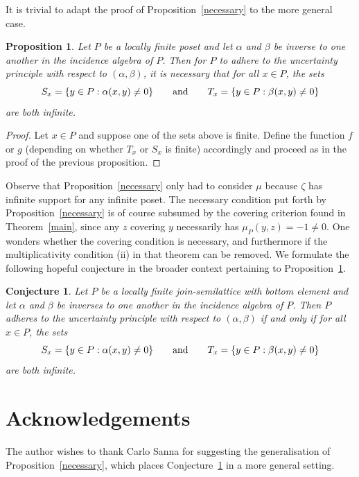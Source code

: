 \documentclass[11pt]{amsart}
\newtheorem{guess}[theorem]{Conjecture}
\newtheorem{proposition}[theorem]{Proposition}
\theoremstyle{myexample}
\theoremstyle{myremark}
\theoremstyle{conjecture}
\numberwithin{equation}{section}
\begin{document}
It is trivial to adapt the proof of Proposition~\ref{necessary} to the more general case.

\begin{proposition}\label{general}
Let $P$ be a locally finite poset and let $\alpha$ and $\beta$
be inverse to one another in the incidence algebra of $P$. Then for $P$ to adhere to the uncertainty
principle with respect to $(\alpha,\beta)$, it is necessary that for all $x\in P$, the sets
$$S_x = \{y \in P : \alpha(x,y) \ne 0\}\qquad\hbox{and}\qquad
T_x = \{y\in P : \beta(x,y)\ne 0\}$$
are both infinite.
\end{proposition}

\begin{proof}
Let $x\in P$ and suppose one of the sets above is finite. Define the function $f$ or
$g$ (depending on whether $T_x$ or $S_x$ is finite) accordingly and proceed as
in the proof of the previous proposition.
\end{proof}

Observe that
Proposition~\ref{necessary} only had to consider $\mu$ because $\zeta$ has infinite support for any infinite
poset.
The necessary condition put forth by Proposition~\ref{necessary}
is of course subsumed by the covering criterion
found in Theorem~\ref{main}, since any $z$ covering $y$ necessarily has $\mu_P(y,z) = -1\ne 0$.
One wonders whether the covering condition is necessary, and furthermore if the multiplicativity
condition (ii) in that theorem can be removed. We formulate the following hopeful conjecture in the broader
context pertaining to Proposition~\ref{general}.

\begin{guess}\label{conj}
Let $P$ be a locally finite join-semilattice with bottom element and let
$\alpha$ and $\beta$ be inverses to one another in the incidence algebra of $P$. Then $P$
adheres to the uncertainty principle with respect to $(\alpha,\beta)$ if and only if
for all $x\in P$, the sets
$$S_x = \{y \in P : \alpha(x,y) \ne 0\}\qquad\hbox{and}\qquad
T_x = \{y\in P : \beta(x,y)\ne 0\}$$
are both infinite.
\end{guess}
\goodbreak

\section*{Acknowledgements}

The author wishes to thank Carlo Sanna for suggesting the generalisation of Proposition~\ref{necessary},
which places Conjecture~\ref{conj} in a more general setting.
\end{document}
